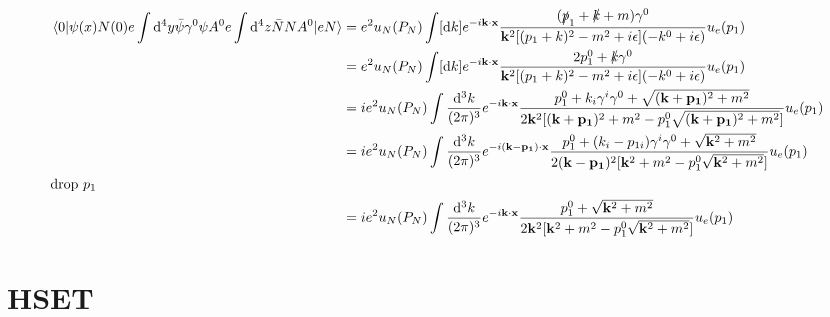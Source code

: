 \documentclass{article}
\newcommand{\g}{\gamma}
\begin{document}
\begin{align*}
  \mel{0}{\psi(x)N(0)e\int\dd^4y\bar\psi\g^0\psi A^0 e\int\dd^4 z \bar N NA^0}{eN}&=e^2u_N(P_N)\int[\dd k]e^{-i\vb{k}\cdot\vb{x}}\frac{(\slashed p_1+\slashed k+m)\g^0}{\vb{k}^2[(p_1+k)^2-m^2+i\epsilon](-k^0+i\epsilon)}u_e(p_1)\\
  &=e^2u_N(P_N)\int[\dd k]e^{-i\vb{k}\cdot\vb{x}}\frac{2p_1^0+\slashed k\g^0}{\vb{k}^2[(p_1+k)^2-m^2+i\epsilon](-k^0+i\epsilon)}u_e(p_1)\\
  &=ie^2u_N(P_N)\int\frac{\dd^3 k}{(2\pi)^3}e^{-i\vb{k}\cdot\vb{x}}\frac{p_1^0+k_i\g^i\g^0+\sqrt{(\vb{k}+\vb{p_1})^2+m^2}}{2\vb{k}^2[(\vb{k}+\vb{p_1})^2+m^2-p_1^0\sqrt{(\vb{k}+\vb{p_1})^2+m^2}]}u_e(p_1)\\
  &=ie^2u_N(P_N)\int\frac{\dd^3 k}{(2\pi)^3}e^{-i(\vb{k-p_1})\cdot\vb{x}}\frac{p_1^0+(k_i-p_{1i})\g^i\g^0+\sqrt{\vb{k}^2+m^2}}{2(\vb{k}-\vb{p_1})^2[\vb{k}^2+m^2-p_1^0\sqrt{\vb{k}^2+m^2}]}u_e(p_1)\\
  \intertext{drop $p_1$}
  &=ie^2u_N(P_N)\int\frac{\dd^3 k}{(2\pi)^3}e^{-i\vb{k}\cdot\vb{x}}\frac{p_1^0+\sqrt{\vb{k}^2+m^2}}{2\vb{k}^2[\vb{k}^2+m^2-p_1^0\sqrt{\vb{k}^2+m^2}]}u_e(p_1)
 \end{align*}
 \section{HSET}
\end{document}
